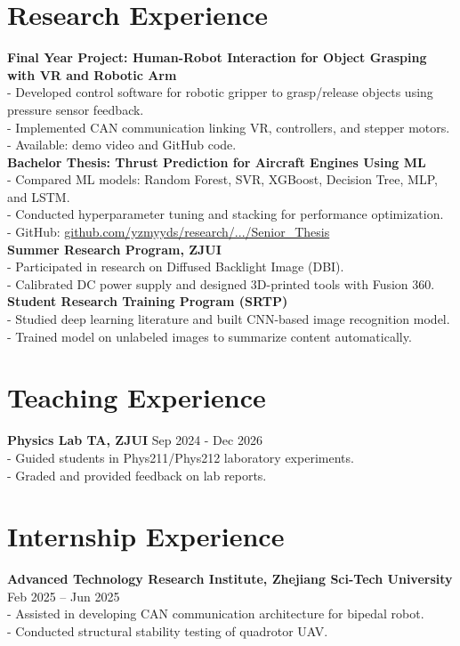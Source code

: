 \documentclass[a4paper,10pt]{article}
\begin{document}
\section*{Research Experience}
\textbf{Final Year Project: Human-Robot Interaction for Object Grasping with VR and Robotic Arm}\\
- Developed control software for robotic gripper to grasp/release objects using pressure sensor feedback.\\
- Implemented CAN communication linking VR, controllers, and stepper motors.\\
- Available: demo video and GitHub code.\\[1mm]
\textbf{Bachelor Thesis: Thrust Prediction for Aircraft Engines Using ML}\\
- Compared ML models: Random Forest, SVR, XGBoost, Decision Tree, MLP, and LSTM.\\
- Conducted hyperparameter tuning and stacking for performance optimization.\\
- GitHub: \href{https://github.com/yzmyyds/research/tree/c8a820a19e95e724b6bed19c4a7711d09be95336/Senior_Thesis}{github.com/yzmyyds/research/.../Senior\_Thesis}\\[1mm]
\textbf{Summer Research Program, ZJUI}\\
- Participated in research on Diffused Backlight Image (DBI).\\
- Calibrated DC power supply and designed 3D-printed tools with Fusion 360.\\[1mm]
\textbf{Student Research Training Program (SRTP)}\\
- Studied deep learning literature and built CNN-based image recognition model.\\
- Trained model on unlabeled images to summarize content automatically.

\section*{Teaching Experience}
\textbf{Physics Lab TA, ZJUI} \hfill Sep 2024 - Dec 2026\\
- Guided students in Phys211/Phys212 laboratory experiments.\\
- Graded and provided feedback on lab reports.

\section*{Internship Experience}
\textbf{Advanced Technology Research Institute, Zhejiang Sci-Tech University} \hfill Feb 2025 -- Jun 2025\\
- Assisted in developing CAN communication architecture for bipedal robot.\\
- Conducted structural stability testing of quadrotor UAV.
\end{document}
